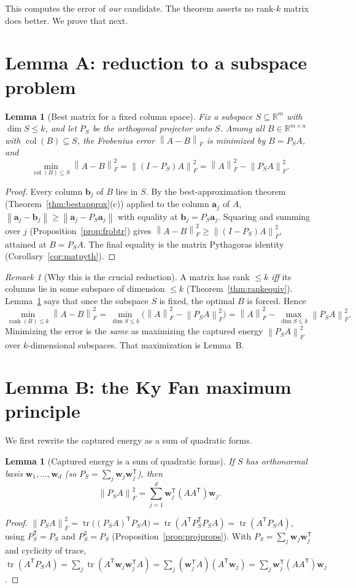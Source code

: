 \documentclass[11pt,oneside]{book}
\theoremstyle{plain}
\newtheorem{lemma}[theorem]{Lemma}
\theoremstyle{definition}
\theoremstyle{remark}
\newtheorem{remark}[theorem]{Remark}
\newcommand{\R}{\mathbb{R}}
\newcommand{\tr}{\operatorname{tr}}
\newcommand{\rank}{\operatorname{rank}}
\newcommand{\col}{\operatorname{col}}
\newcommand{\dimm}{\operatorname{dim}}
\newcommand{\norm}[1]{\left\lVert #1 \right\rVert}
\newcommand{\fn}[1]{\norm{#1}_F}
\newcommand{\T}{^{\mathsf T}}
\newcommand{\bw}{\mathbf{w}}
\newcommand{\ba}{\mathbf{a}}
\newcommand{\bb}{\mathbf{b}}
\begin{document}
This computes the error of \emph{our} candidate. The theorem asserts no rank-$k$ matrix
does better. We prove that next.

\section{Lemma A: reduction to a subspace problem}

\begin{lemma}[Best matrix for a fixed column space]\label{lem:projbest}
Fix a subspace $S\subseteq\R^m$ with $\dimm S\le k$, and let $P_S$ be the orthogonal
projector onto $S$. Among all $B\in\R^{m\times n}$ with $\col(B)\subseteq S$, the
Frobenius error $\fn{A-B}$ is minimized by $B=P_SA$, and
\[
\min_{\col(B)\subseteq S}\fn{A-B}^2=\fn{(I-P_S)A}^2=\fn{A}^2-\fn{P_SA}^2 .
\]
\end{lemma}
\begin{proof}
Every column $\bb_j$ of $B$ lies in $S$. By the best-approximation theorem
(Theorem~\ref{thm:bestapprox}(c)) applied to the column $\ba_j$ of $A$,
$\norm{\ba_j-\bb_j}\ge\norm{\ba_j-P_S\ba_j}$ with equality at $\bb_j=P_S\ba_j$.
Squaring and summing over $j$ (Proposition~\ref{prop:frobtr}) gives
$\fn{A-B}^2\ge\fn{(I-P_S)A}^2$, attained at $B=P_SA$. The final equality is the matrix
Pythagoras identity (Corollary~\ref{cor:matpyth}).
\end{proof}

\begin{remark}[Why this is the crucial reduction]
A matrix has rank $\le k$ \emph{iff} its columns lie in some subspace of dimension
$\le k$ (Theorem~\ref{thm:rankequiv}). Lemma~\ref{lem:projbest} says that once the
subspace $S$ is fixed, the optimal $B$ is forced. Hence
\[
\min_{\rank(B)\le k}\fn{A-B}^2
=\min_{\dimm S\le k}\bigl(\fn{A}^2-\fn{P_SA}^2\bigr)
=\fn{A}^2-\max_{\dimm S\le k}\fn{P_SA}^2 .
\]
Minimizing the error is the \emph{same} as maximizing the captured energy
$\fn{P_SA}^2$ over $k$-dimensional subspaces. That maximization is Lemma~B.
\end{remark}

\section{Lemma B: the Ky Fan maximum principle}

We first rewrite the captured energy as a sum of quadratic forms.

\begin{lemma}[Captured energy is a sum of quadratic forms]\label{lem:capture}
If $S$ has orthonormal basis $\bw_1,\dots,\bw_d$ (so $P_S=\sum_j\bw_j\bw_j\T$), then
\[
\fn{P_SA}^2=\sum_{j=1}^d\bw_j\T(AA\T)\bw_j .
\]
\end{lemma}
\begin{proof}
$\fn{P_SA}^2=\tr\bigl((P_SA)\T P_SA\bigr)=\tr(A\T P_S\T P_S A)=\tr(A\T P_S A)$, using
$P_S\T=P_S$ and $P_S^2=P_S$ (Proposition~\ref{prop:projprops}). With
$P_S=\sum_j\bw_j\bw_j\T$ and cyclicity of trace,
$\tr(A\T P_S A)=\sum_j\tr(A\T\bw_j\bw_j\T A)=\sum_j(\bw_j\T A)(A\T\bw_j)
=\sum_j\bw_j\T(AA\T)\bw_j$.
\end{proof}
\end{document}
